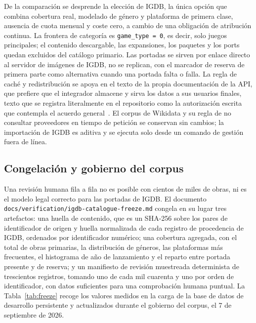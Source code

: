 De la comparación se desprende la elección de IGDB, la única opción que combina cobertura
real, modelado de género y plataforma de primera clase, ausencia de cuota mensual y coste
cero, a cambio de una obligación de atribución continua. La frontera de categoría es
\texttt{game\_type = 0}, es decir, solo juegos principales; el contenido descargable, las
expansiones, los paquetes y los ports quedan excluidos del catálogo primario. Las portadas se
sirven por enlace directo al servidor de imágenes de IGDB, no se replican, con el marcador de
reserva de primera parte como alternativa cuando una portada falta o falla. La
regla de caché y redistribución se apoya en el texto de la propia documentación de la API,
que prefiere que el integrador almacene y sirva los datos a sus usuarios finales, texto que
se registra literalmente en el repositorio como la autorización escrita que contempla el
acuerdo general~\cite{twitch-dsa}. El corpus de Wikidata y su regla de no consultar
proveedores en tiempo de petición se conservan sin cambios; la importación de IGDB es aditiva
y se ejecuta solo desde un comando de gestión fuera de línea.

\subsection{Congelación y gobierno del corpus}\label{sec:datos-congelacion}

Una revisión humana fila a fila no es posible con cientos de miles de obras, ni es el modelo
legal correcto para las portadas de IGDB. El documento
\texttt{docs/verification/igdb-catalogue-freeze.md} congela en su lugar tres artefactos: una
huella de contenido, que es un SHA-256 sobre los pares de identificador de origen y huella
normalizada de cada registro de procedencia de IGDB, ordenados por identificador numérico;
una cobertura agregada, con el total de obras primarias, la distribución de géneros, las
plataformas más frecuentes, el histograma de año de lanzamiento y el reparto entre portada
presente y de reserva; y un manifiesto de revisión muestreada determinista de trescientos
registros, tomando uno de cada mil cuarenta y uno por orden de identificador, con datos
suficientes para una comprobación humana puntual. La Tabla~\ref{tab:freeze} recoge los
valores medidos en la carga de la base de datos de desarrollo persistente y actualizados
durante el gobierno del corpus, el 7 de septiembre de 2026.

